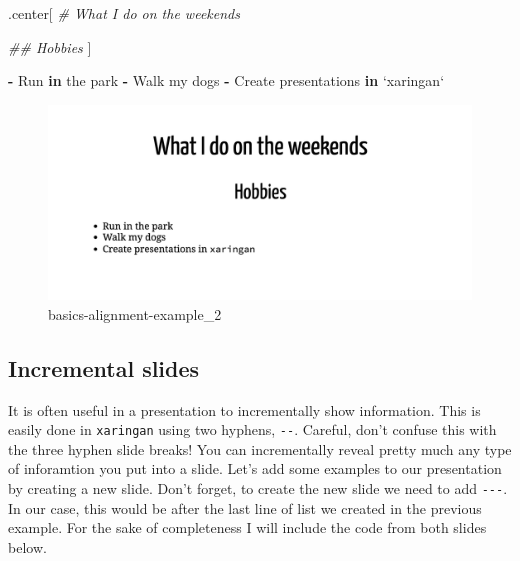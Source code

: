 \documentclass[
]{book}
\newenvironment{Shaded}{\begin{snugshade}}{\end{snugshade}}
\newcommand{\CommentTok}[1]{\textcolor[rgb]{0.37,0.37,0.37}{\textit{#1}}}
\newcommand{\ControlFlowTok}[1]{\textcolor[rgb]{0.27,0.27,0.27}{\textbf{#1}}}
\newcommand{\DataTypeTok}[1]{\textcolor[rgb]{0.27,0.27,0.27}{#1}}
\newcommand{\NormalTok}[1]{#1}
\newcommand{\OperatorTok}[1]{\textcolor[rgb]{0.43,0.43,0.43}{\textbf{#1}}}
\newcommand{\StringTok}[1]{\textcolor[rgb]{0.5,0.5,0.5}{#1}}
\begin{document}
\begin{Shaded}
\begin{Highlighting}[]
\NormalTok{.center[}
\CommentTok{# What I do on the weekends}

\CommentTok{## Hobbies}
\NormalTok{]}

\OperatorTok{-}\StringTok{ }\NormalTok{Run }\ControlFlowTok{in}\NormalTok{ the park }
\OperatorTok{-}\StringTok{ }\NormalTok{Walk my dogs }
\OperatorTok{-}\StringTok{ }\NormalTok{Create presentations }\ControlFlowTok{in} \StringTok{`}\DataTypeTok{xaringan}\StringTok{`}
\end{Highlighting}
\end{Shaded}

\begin{figure}
\centering
\includegraphics{img/02_basics-alignment-example_2.png}
\caption{basics-alignment-example\_2}
\end{figure}

\hypertarget{incremental-slides}{%
\subsection{Incremental slides}\label{incremental-slides}}

It is often useful in a presentation to incrementally show information. This is easily done in \texttt{xaringan} using two hyphens, \texttt{-\/-}. Careful, don't confuse this with the three hyphen slide breaks! You can incrementally reveal pretty much any type of inforamtion you put into a slide. Let's add some examples to our presentation by creating a new slide. Don't forget, to create the new slide we need to add \texttt{-\/-\/-}. In our case, this would be after the last line of list we created in the previous example. For the sake of completeness I will include the code from both slides below.
\end{document}
